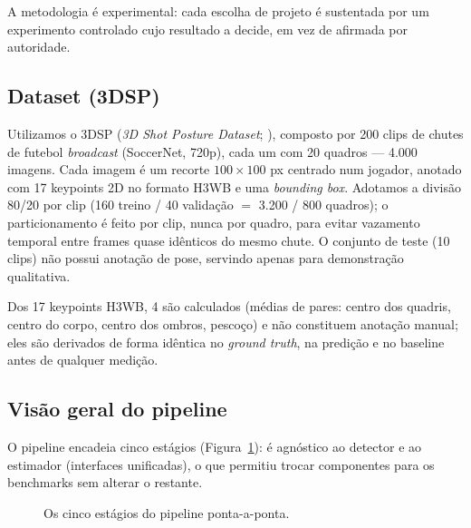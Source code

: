\documentclass[12pt]{article}
\begin{document}
A metodologia é experimental: cada escolha de projeto é sustentada por um experimento controlado cujo resultado a decide, em vez de afirmada por autoridade.

\subsection{Dataset (3DSP)}

Utilizamos o 3DSP (\emph{3D Shot Posture Dataset}; \cite{yeung2024}), composto por 200 clips de chutes de futebol \emph{broadcast} (SoccerNet, 720p), cada um com 20 quadros --- 4.000 imagens. Cada imagem é um recorte $100\times100$ px centrado num jogador, anotado com 17 keypoints 2D no formato H3WB e uma \emph{bounding box}. Adotamos a divisão 80/20 por clip (160 treino / 40 validação $=$ 3.200 / 800 quadros); o particionamento é feito por clip, nunca por quadro, para evitar vazamento temporal entre frames quase idênticos do mesmo chute. O conjunto de teste (10 clips) não possui anotação de pose, servindo apenas para demonstração qualitativa.

Dos 17 keypoints H3WB, 4 são calculados (médias de pares: centro dos quadris, centro do corpo, centro dos ombros, pescoço) e não constituem anotação manual; eles são derivados de forma idêntica no \emph{ground truth}, na predição e no baseline antes de qualquer medição.

\subsection{Visão geral do pipeline}

O pipeline encadeia cinco estágios (Figura~\ref{fig:pipeline}): é agnóstico ao detector e ao estimador (interfaces unificadas), o que permitiu trocar componentes para os benchmarks sem alterar o restante.

\begin{figure}[ht]
\centering
{}
\caption{Os cinco estágios do pipeline ponta-a-ponta.}
\label{fig:pipeline}
\end{figure}
\end{document}
